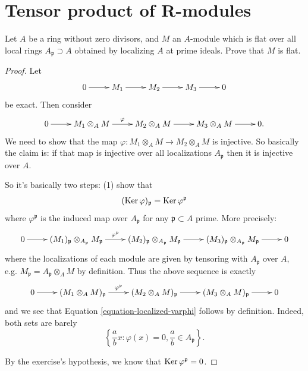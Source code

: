 \section{Tensor product of R-modules}

\begin{exercise}
\label{exercise-local-flat-implies-flat}
Let $A$ be a ring without zero divisors,
and $M$ an $A$-module
which is flat over all local rings
$A_\mathfrak{p} \supset A$
obtained by localizing $A$
at prime ideals.
Prove that $M$ is flat.
\end{exercise}

\begin{proof}
Let
$$
\xymatrix{
0\ar[r]
&M_1\ar[r]
&M_2\ar[r]
&M_3\ar[r]
&0
}
$$
be exact. Then consider
$$
\xymatrix{
0\ar[r]
&M_1 \otimes_A M\ar[r]^{\varphi}
&M_2 \otimes_A M\ar[r]
&M_3 \otimes_A M\ar[r]
&0.
}
$$
We need to show that the map
$\varphi: M_1 \otimes_A M 
\to M_2 \otimes_A M$ is injective.
So basically the claim is:
if that map is injective
over all localizations $A_{\mathfrak{p}}$
then it is injective over $A$.

So it's basically two steps:
(1) show that
\begin{equation}
\label{equation-localized-varphi}
(\mathop{\mathrm{Ker}} \varphi)_{\mathfrak{p}}
=
\mathop{\mathrm{Ker}} \varphi^{\mathfrak{p}}
\end{equation}
where $\varphi^{\mathfrak{p}}$
is the induced map over $A_{\mathfrak{p}}$
for any $\mathfrak{p} \subset A$
prime. More precisely:
$$
\xymatrix{
0\ar[r]
&(M_1)_{\mathfrak{p}} 
\otimes_{A_{\mathfrak{p}}}M_{\mathfrak{p}}
\ar[r]^{
\varphi^{\mathfrak{p}}}
&
(M_2)_{\mathfrak{p}} 
\otimes_{A_{\mathfrak{p}}}
M_{\mathfrak{p}}\ar[r]
&(M_3)_{\mathfrak{p}}
\otimes_{A_{\mathfrak{p}}}
M_{\mathfrak{p}}\ar[r]
&0
}
$$
where the localizations of each module
are given by tensoring with $A_{\mathfrak{p}}$
over $A$, e.g. $M_{\mathfrak{p}} =
A_{\mathfrak{p}} \otimes_A M$ by definition.
Thus the above sequence is exactly
$$
\xymatrix{
0\ar[r]
&(M_1 \otimes_A M)_{\mathfrak{p}}\ar[r]
^{\varphi^{\mathfrak{p}}}
&(M_2 \otimes_A M)_{\mathfrak{p}}\ar[r]
&(M_3 \otimes_A M)_{\mathfrak{p}}\ar[r]
&0
}
$$
and we see that
Equation \ref{equation-localized-varphi}
follows by definition.
Indeed, both sets are barely
$$
\left\{
\frac{a}{b}x:\varphi(x)=0,
\frac{a}{b}\in A_{\mathfrak{p}}\right\}.
$$


By the exercise's hypothesis, we know that
$\mathop{\mathrm{Ker}} \varphi^{\mathfrak{p}}=0$.


\end{proof}
